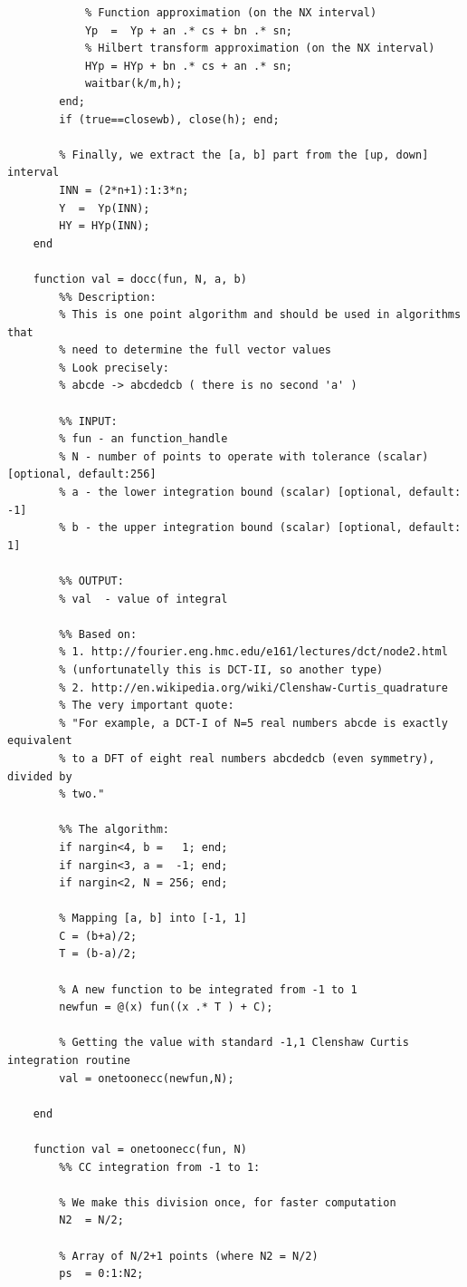 \documentclass[12pt,twoside,a4paper]{article}
\numberwithin{equation}{subsection}
\numberwithin{figure}{subsection}
\begin{document}
\begin{lstlisting}
	        % Function approximation (on the NX interval)
	        Yp  =  Yp + an .* cs + bn .* sn;
	        % Hilbert transform approximation (on the NX interval)
	        HYp = HYp + bn .* cs + an .* sn;
	        waitbar(k/m,h);
	    end; 
	    if (true==closewb), close(h); end;
	
	    % Finally, we extract the [a, b] part from the [up, down] interval
	    INN = (2*n+1):1:3*n;
	    Y  =  Yp(INN); 
	    HY = HYp(INN); 
	end
	
	function val = docc(fun, N, a, b)
	    %% Description:
	    % This is one point algorithm and should be used in algorithms that
	    % need to determine the full vector values
	    % Look precisely:
	    % abcde -> abcdedcb ( there is no second 'a' )
	    
	    %% INPUT:
	    % fun - an function_handle 
	    % N - number of points to operate with tolerance (scalar) [optional, default:256]
	    % a - the lower integration bound (scalar) [optional, default: -1]
	    % b - the upper integration bound (scalar) [optional, default:  1]
	    
	    %% OUTPUT:
	    % val  - value of integral
	    
	    %% Based on:
	    % 1. http://fourier.eng.hmc.edu/e161/lectures/dct/node2.html
	    % (unfortunatelly this is DCT-II, so another type)
	    % 2. http://en.wikipedia.org/wiki/Clenshaw-Curtis_quadrature
	    % The very important quote: 
	    % "For example, a DCT-I of N=5 real numbers abcde is exactly equivalent
	    % to a DFT of eight real numbers abcdedcb (even symmetry), divided by
	    % two."
	    
	    %% The algorithm:
	    if nargin<4, b =   1; end;
	    if nargin<3, a =  -1; end;
	    if nargin<2, N = 256; end;
	
	    % Mapping [a, b] into [-1, 1]
	    C = (b+a)/2;
	    T = (b-a)/2;
	    
	    % A new function to be integrated from -1 to 1    
	    newfun = @(x) fun((x .* T ) + C);
	
	    % Getting the value with standard -1,1 Clenshaw Curtis integration routine
	    val = onetoonecc(newfun,N);
	    
	end
	    
	function val = onetoonecc(fun, N)
	    %% CC integration from -1 to 1:
	    
	    % We make this division once, for faster computation
	    N2  = N/2;                                           
	    
	    % Array of N/2+1 points (where N2 = N/2)
	    ps  = 0:1:N2;                                        
	    

\end{lstlisting}
\end{document}
